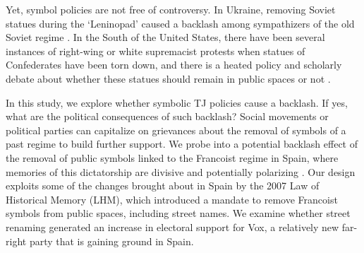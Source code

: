 \documentclass[12pt, titlepage]{article}
\begin{document}

Yet, symbol policies are not free of controversy. In Ukraine, removing Soviet statues during the `Leninopad' caused a backlash among sympathizers of the old Soviet regime \citep{Rozenas:2021}. In the South of the United States, there have been several instances of right-wing or white supremacist protests when statues of Confederates have been torn down, and there is a heated policy and scholarly debate about whether these statues should remain in public spaces or not \citep{Grossman:2016}.


In this study, we explore whether symbolic TJ policies cause a backlash. If yes, what are the political consequences of such backlash? Social movements or political parties can capitalize on grievances about the removal of symbols of a past regime to build further support. We probe into a potential backlash effect of the removal of public symbols linked to the Francoist regime in Spain, where memories of this dictatorship are divisive and potentially polarizing \citep{Balcells:2012aa}.
Our design exploits some of the changes brought about in Spain by the 2007 Law of Historical Memory (LHM), which introduced a mandate to remove Francoist symbols from public spaces, including street names. We examine whether street renaming generated an increase in electoral support for Vox, a relatively new far-right party that is gaining ground in Spain.
\end{document}

